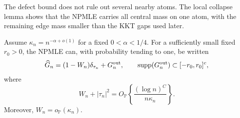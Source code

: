 The defect bound does not rule out several nearby atoms. The local collapse
lemma shows that the NPMLE carries all central mass on one atom, with the
remaining edge mass smaller than the KKT gaps used later.
\begin{lemma}
\label{lem:support-fixed-core-collapse}
Assume \(\kappa_n=n^{-\alpha+o(1)}\) for a fixed
\(0<\alpha<1/4\). For a sufficiently small fixed \(r_0>0\), the NPMLE can,
with probability tending to one,
be written
\begin{equation}
\label{eq:support-central-decomposition}
    \widehat G_n=(1-W_n)\delta_{\tau_n}+G_n^{\rm out},
    \qquad
    \operatorname{supp}(G_n^{\rm out})\subset[-r_0,r_0]^c,
\end{equation}
where
\[
    W_n+|\tau_n|^2
    =O_{\mathbb P}\left\{\frac{(\log n)^C}{n\kappa_n}\right\}.
\]
Moreover, \(W_n=o_{\mathbb P}(\kappa_n)\).
\end{lemma}


